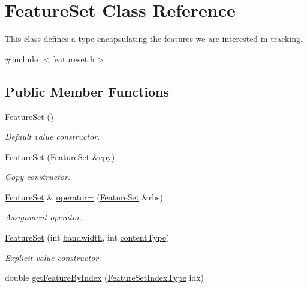 \hypertarget{classFeatureSet}{\section{Feature\-Set Class Reference}
\label{classFeatureSet}
}


This class defines a type encapsulating the features we are interested in tracking.  




{\ttfamily \#include $<$featureset.\-h$>$}

\subsection*{Public Member Functions}
\begin{DoxyCompactItemize}
\item 
\hyperlink{classFeatureSet_ad6569f9f2143e38bf9c1378d55cd2989}{Feature\-Set} ()
\begin{DoxyCompactList}\small\item\em Default value constructor. \end{DoxyCompactList}\item 
\hyperlink{classFeatureSet_a53ceec8da14074eab01394ecef16d105}{Feature\-Set} (\hyperlink{classFeatureSet}{Feature\-Set} \&cpy)
\begin{DoxyCompactList}\small\item\em Copy constructor. \end{DoxyCompactList}\item 
\hyperlink{classFeatureSet}{Feature\-Set} \& \hyperlink{classFeatureSet_a6a2c0ba84a4cbe182b68909e58ab094b}{operator=} (\hyperlink{classFeatureSet}{Feature\-Set} \&rhs)
\begin{DoxyCompactList}\small\item\em Assignment operator. \end{DoxyCompactList}\item 
\hyperlink{classFeatureSet_afb3fe8535abb9373a71eeb44e0462ca0}{Feature\-Set} (int \hyperlink{classFeatureSet_a53c3d1d1d34efe2cd249f51af1a3857b}{bandwidth}, int \hyperlink{classFeatureSet_a9501ef16be4a0d58f1b9ac1834dbfad8}{content\-Type})
\begin{DoxyCompactList}\small\item\em Explicit value constructor. \end{DoxyCompactList}\item 
double \hyperlink{classFeatureSet_ae52a10b96e8ec9e7251ca0afea8953dc}{get\-Feature\-By\-Index} (\hyperlink{featureset_8h_ac4bad40688e41b3e2de5f3684858138f}{Feature\-Set\-Index\-Type} idx)

\end{DoxyCompactItemize}
